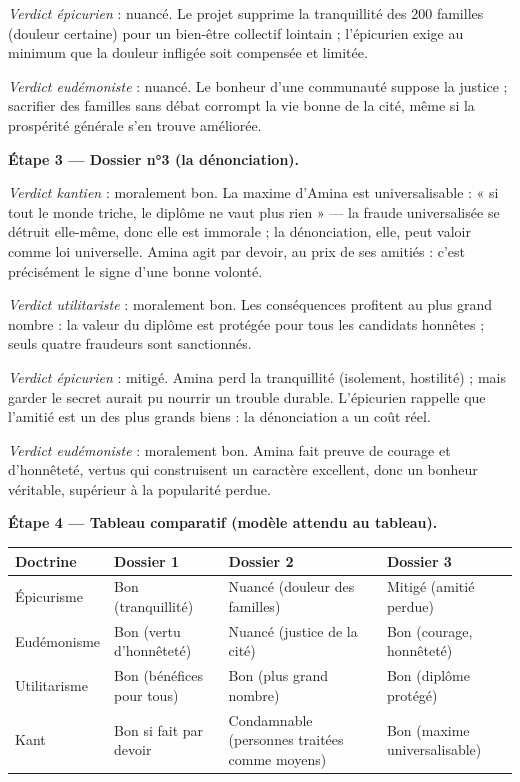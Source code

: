 \documentclass[11pt]{article}
\begin{document}
\begin{exoresolu}
\emph{Verdict épicurien} : nuancé. Le projet supprime la tranquillité des 200 familles (douleur certaine) pour un bien-être collectif lointain ; l'épicurien exige au minimum que la douleur infligée soit compensée et limitée.

\emph{Verdict eudémoniste} : nuancé. Le bonheur d'une communauté suppose la justice ; sacrifier des familles sans débat corrompt la vie bonne de la cité, même si la prospérité générale s'en trouve améliorée.

\textbf{Étape 3 — Dossier n°3 (la dénonciation).}

\emph{Verdict kantien} : moralement bon. La maxime d'Amina est universalisable : « si tout le monde triche, le diplôme ne vaut plus rien » — la fraude universalisée se détruit elle-même, donc elle est immorale ; la dénonciation, elle, peut valoir comme loi universelle. Amina agit par devoir, au prix de ses amitiés : c'est précisément le signe d'une bonne volonté.

\emph{Verdict utilitariste} : moralement bon. Les conséquences profitent au plus grand nombre : la valeur du diplôme est protégée pour tous les candidats honnêtes ; seuls quatre fraudeurs sont sanctionnés.

\emph{Verdict épicurien} : mitigé. Amina perd la tranquillité (isolement, hostilité) ; mais garder le secret aurait pu nourrir un trouble durable. L'épicurien rappelle que l'amitié est un des plus grands biens : la dénonciation a un coût réel.

\emph{Verdict eudémoniste} : moralement bon. Amina fait preuve de courage et d'honnêteté, vertus qui construisent un caractère excellent, donc un bonheur véritable, supérieur à la popularité perdue.

\textbf{Étape 4 — Tableau comparatif (modèle attendu au tableau).}

\begin{center}
\begin{tabularx}{\linewidth}{|l|X|X|X|}
\hline
\rowcolor{popblueL} \textbf{Doctrine} & \textbf{Dossier 1} & \textbf{Dossier 2} & \textbf{Dossier 3} \\
\hline
Épicurisme & Bon (tranquillité) & Nuancé (douleur des familles) & Mitigé (amitié perdue) \\
\hline
Eudémonisme & Bon (vertu d'honnêteté) & Nuancé (justice de la cité) & Bon (courage, honnêteté) \\
\hline
Utilitarisme & Bon (bénéfices pour tous) & Bon (plus grand nombre) & Bon (diplôme protégé) \\
\hline
Kant & Bon si fait par devoir & Condamnable (personnes traitées comme moyens) & Bon (maxime universalisable) \\
\hline
\end{tabularx}
\end{center}


\end{exoresolu}
\end{document}
